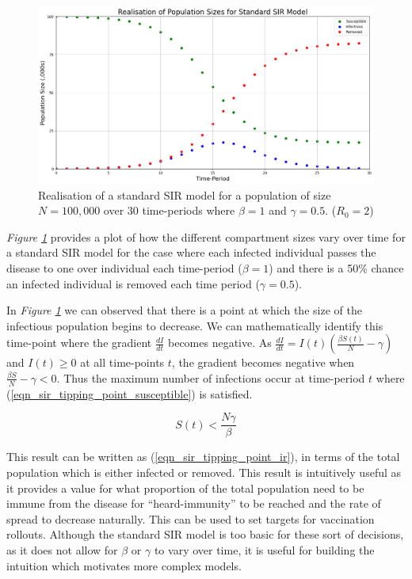 \documentclass[11pt,a4paper]{article}
\theoremstyle{break}
\begin{document}
  \begin{figure}[H]
    \centering\includegraphics[width=.9\textwidth]{example_sir_model.png}
    \caption{Realisation of a standard SIR model for a population of size $N=100,000$ over 30 time-periods where $\beta=1$ and $\gamma=0.5$. ($R_0=2$)}
    \label{fig_example_standard_sir_model}
  \end{figure}

  \par \textit{Figure \ref{fig_example_standard_sir_model}} provides a plot of how the different compartment sizes vary over time for a standard SIR model for the case where each infected individual passes the disease to one over individual each time-period ($\beta=1$) and there is a 50\% chance an infected individual is removed each time period ($\gamma=0.5$).

  \par In \textit{Figure \ref{fig_example_standard_sir_model}} we can observed that there is a point at which the size of the infectious population begins to decrease. We can mathematically identify this time-point where the gradient $\frac{dI}{dt}$ becomes negative. As $\frac{dI}{dt}=I(t)\left(\frac{\beta S(t)}N-\gamma\right)$ and $I(t)\geq0$ at all time-points $t$, the gradient becomes negative when $\frac{\beta S}N-\gamma<0$. Thus the maximum number of infections occur at time-period $t$ where (\ref{eqn_sir_tipping_point_susceptible}) is satisfied.

  \begin{equation}\label{eqn_sir_tipping_point_susceptible}
    S(t)<\frac{N\gamma}\beta
  \end{equation}


  \par This result can be written as (\ref{eqn_sir_tipping_point_ir}), in terms of the total population which is either infected or removed. This result is intuitively useful as it provides a value for what proportion of the total population need to be immune from the disease for ``heard-immunity'' to be reached and the rate of spread to decrease naturally. This can be used to set targets for vaccination rollouts. Although the standard SIR model is too basic for these sort of decisions, as it does not allow for $\beta$ or $\gamma$ to vary over time, it is useful for building the intuition which motivates more complex models.
\end{document}
